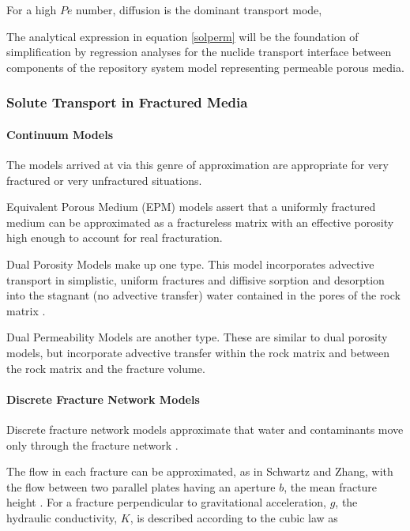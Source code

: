 For a high $Pe$ number, diffusion is the dominant transport mode, 

The analytical expression in equation \eqref{solperm} will be the foundation of 
simplification by regression analyses for the nuclide transport interface 
between components of the repository system model representing permeable porous 
media.  

\subsubsection{Solute Transport in Fractured Media} 

\paragraph{Continuum Models} 

The models arrived at via this genre of approximation are appropriate
for very fractured or very unfractured situations.

Equivalent Porous Medium (EPM) models assert that a uniformly  fractured medium
can be approximated as a fractureless matrix with an effective porosity high
enough to account for real fracturation.  \cite{berkowitz_continuum_1988}
\cite{anderson_applied_1992}


Dual Porosity Models make up one type. This model incorporates advective
transport in simplistic, uniform fractures and diffisive sorption and
desorption into the stagnant (no advective transfer) water contained in the
pores of the rock matrix \cite{uleberg_dual_1996} \cite{ho_dual_2000}.


Dual Permeability Models are another type. These are similar to dual porosity
models, but incorporate advective transfer within the rock matrix and between
the rock matrix and the fracture volume.  \cite{uleberg_dual_1996}
\cite{ho_dual_2000}

\paragraph{Discrete Fracture Network Models} Discrete fracture network models
approximate that water and contaminants move only through the fracture network
\cite{anderson_applied_1992} \cite{schwartz_fundamentals_2003}.

The flow in each fracture can be approximated, as in Schwartz and Zhang, with
the flow between two parallel plates having an aperture $b$, the mean fracture
height \cite{schwartz_fundamentals_2003}. For a fracture perpendicular to
gravitational acceleration, $g$, the hydraulic conductivity, $K$, is described
according to the cubic law as 

